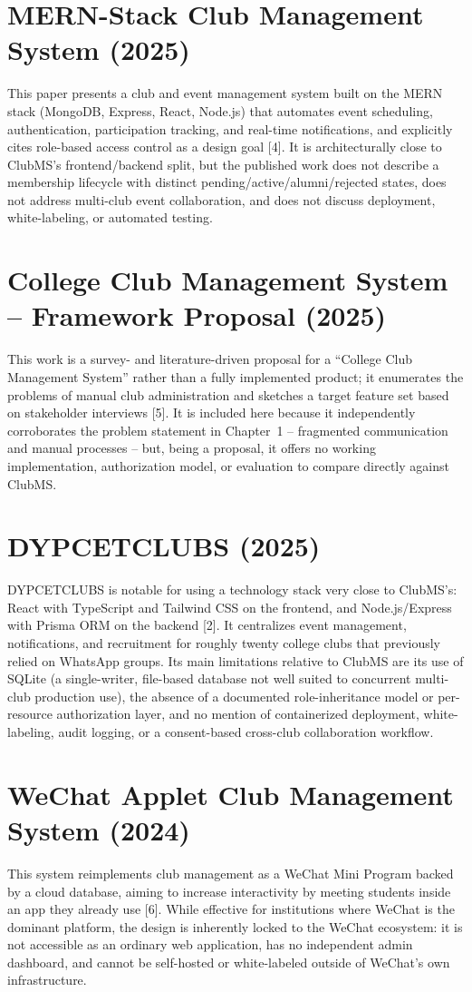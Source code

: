 \documentclass[12pt,oneside]{book}
\begin{document}
\section{MERN-Stack Club Management System (2025)}
This paper presents a club and event management system built on the MERN stack (MongoDB, Express, React, Node.js) that automates event scheduling, authentication, participation tracking, and real-time notifications, and explicitly cites role-based access control as a design goal [4]. It is architecturally close to ClubMS's frontend/backend split, but the published work does not describe a membership lifecycle with distinct pending/active/alumni/rejected states, does not address multi-club event collaboration, and does not discuss deployment, white-labeling, or automated testing.

\section{College Club Management System -- Framework Proposal (2025)}
This work is a survey- and literature-driven proposal for a ``College Club Management System'' rather than a fully implemented product; it enumerates the problems of manual club administration and sketches a target feature set based on stakeholder interviews [5]. It is included here because it independently corroborates the problem statement in Chapter~1 -- fragmented communication and manual processes -- but, being a proposal, it offers no working implementation, authorization model, or evaluation to compare directly against ClubMS.

\section{DYPCETCLUBS (2025)}
DYPCETCLUBS is notable for using a technology stack very close to ClubMS's: React with TypeScript and Tailwind CSS on the frontend, and Node.js/Express with Prisma ORM on the backend [2]. It centralizes event management, notifications, and recruitment for roughly twenty college clubs that previously relied on WhatsApp groups. Its main limitations relative to ClubMS are its use of SQLite (a single-writer, file-based database not well suited to concurrent multi-club production use), the absence of a documented role-inheritance model or per-resource authorization layer, and no mention of containerized deployment, white-labeling, audit logging, or a consent-based cross-club collaboration workflow.

\section{WeChat Applet Club Management System (2024)}
This system reimplements club management as a WeChat Mini Program backed by a cloud database, aiming to increase interactivity by meeting students inside an app they already use [6]. While effective for institutions where WeChat is the dominant platform, the design is inherently locked to the WeChat ecosystem: it is not accessible as an ordinary web application, has no independent admin dashboard, and cannot be self-hosted or white-labeled outside of WeChat's own infrastructure.
\end{document}

